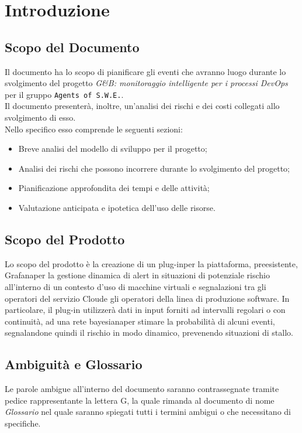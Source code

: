 \section{Introduzione}

\subsection{Scopo del Documento}
Il documento ha lo scopo di pianificare gli eventi che avranno luogo durante lo svolgimento del progetto \textit{G\&B: monitoraggio intelligente per i processi DevOps\glossario} per il gruppo \texttt{Agents of S.W.E.}.\\
Il documento presenterà, inoltre, un'analisi dei rischi e dei costi collegati allo svolgimento di esso. \\
Nello specifico esso comprende le seguenti sezioni:
\begin{itemize}
\item Breve analisi del modello di sviluppo per il progetto;
\item Analisi dei rischi che possono incorrere durante lo svolgimento del progetto;
\item Pianificazione approfondita dei tempi e delle attività;
\item Valutazione anticipata e ipotetica dell'uso delle risorse.
\end{itemize}
 
\subsection{Scopo del Prodotto} 
Lo scopo del prodotto è la creazione di un plug-in\glossario  per la piattaforma, preesistente,
Grafana\glossario per la gestione dinamica di alert in situazioni di potenziale rischio all’interno
di un contesto d’uso di macchine virtuali e segnalazioni tra gli operatori del servizio
Cloud\glossario e gli operatori della linea di produzione software. In particolare, il plug-in
utilizzerà dati in input forniti ad intervalli regolari o con continuità, ad una rete
bayesiana\glossario per stimare la probabilità di alcuni eventi, segnalandone quindi il rischio
in modo dinamico, prevenendo situazioni di stallo.
 
\subsection{Ambiguità e Glossario}
Le parole ambigue all'interno del documento saranno contrassegnate tramite pedice rappresentante la lettera \textmd{G}, la quale rimanda al documento di nome \textit{Glossario} nel quale saranno spiegati tutti i termini ambigui o che necessitano di specifiche.

